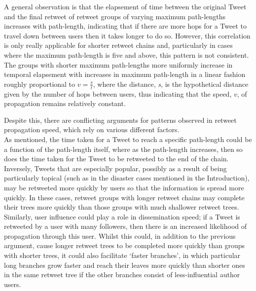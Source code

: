 
A general observation is that the elapsement of time between the original Tweet and the final retweet of retweet groups of varying maximum path-lengths increases with path-length, indicating that if there are more hops for a Tweet to travel down between users then it takes longer to do so. However, this correlation is only really applicable for shorter retweet chains and, particularly in cases where the maximum path-length is five and above, this pattern is not consistent.\\
The groups with shorter maximum path-lengths more uniformly increase in temporal elapsement with increases in maximum path-length in a linear fashion roughly proportional to $ v=\frac{s}{t} $, where the distance, \textit{s}, is the hypothetical distance given by the number of hops between users, thus indicating that the speed, $v$, of propagation remains relatively constant. 

Despite this, there are conflicting arguments for patterns observed in retweet propagation speed, which rely on various different factors.\\
As mentioned, the time taken for a Tweet to reach a specific path-length could be a function of the path-length itself, where as the path-length increases, then so does the time taken for the Tweet to be retweeted to the end of the chain.\\
Inversely, Tweets that are especially popular, possibly as a result of being particularly topical (such as in the disaster cases mentioned in the Introduction), may be retweeted more quickly by users so that the information is spread more quickly. In these cases, retweet groups with longer retweet chains may complete their trees more quickly than those groups with much shallower retweet trees.\\
Similarly, user influence could play a role in dissemination speed; if a Tweet is retweeted by a user with many followers, then there is an increased likelihood of propagation through this user. Whilst this could, in addition to the previous argument, cause longer retweet trees to be completed more quickly than groups with shorter trees, it could also facilitate `faster branches', in which particular long branches grow faster and reach their leaves more quickly than shorter ones in the same retweet tree if the other branches consist of less-influential author users.

